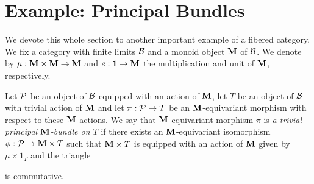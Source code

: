 \section{Example: Principal Bundles}
\noindent
We devote this whole section to another important example of a fibered category. We fix a category with finite limits ${\mathcal B}$ and a monoid object $\mathbf{M}$ of ${\mathcal B}$. We denote by $\mu:\mathbf{M}\times \mathbf{M}\rightarrow \mathbf{M}$ and $e:\mathbf{1}\rightarrow \mathbf{M}$ the multiplication and unit of $\mathbf{M}$, respectively.

\begin{definition}
Let ${\mathcal P}$ be an object of ${\mathcal B}$ equipped with an action of $\mathbf{M}$, let $T$ be an object of ${\mathcal B}$ with trivial action of $\mathbf{M}$ and let $\pi:{\mathcal P}\rightarrow T$ be an $\mathbf{M}$-equivariant morphism with respect to these $\mathbf{M}$-actions. We say that $\mathbf{M}$-equivariant morphism $\pi$ is \textit{a trivial principal $\mathbf{M}$-bundle on $T$} if there exists an $\mathbf{M}$-equivariant isomorphism $\phi:{\mathcal P}\rightarrow \mathbf{M}\times T$ such that $\mathbf{M}\times T$ is equipped with an action of $\mathbf{M}$ given by $\mu\times 1_T$ and the triangle
\begin{center}
\end{center}
is commutative.
\end{definition}

